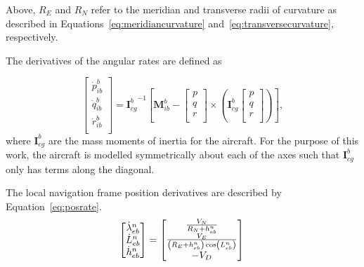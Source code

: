 Above, \(R_E\) and \(R_N\) refer to the meridian and transverse radii of curvature as described in Equations~\ref{eq:meridiancurvature} and~\ref{eq:transversecurvature}, respectively.

The derivatives of the angular rates are defined as

\begin{equation}\label{eq:angacc}
    \begin{bmatrix}
        \dot{p}_{ib}^b \\
        \dot{q}_{ib}^b \\
        \dot{r}_{ib}^b \\
    \end{bmatrix} =
    {\mathbf{I}_{cg}^b}^{-1}\left[\mathbf{M}_{ib}^b -
        \begin{bmatrix}
            p \\
            q \\
            r \\
        \end{bmatrix} \times
        \left(\mathbf{I}_{cg}^b
        \begin{bmatrix}
            p \\
            q \\
            r \\
        \end{bmatrix}
        \right)
        \right],
\end{equation}
where \(\mathbf{I}_{cg}^b\) are the mass moments of inertia for the aircraft. For the purpose of this work, the aircraft is modelled symmetrically about each of the axes such that \(\mathbf{I}_{cg}^b\) only has terms along the diagonal.

The local navigation frame position derivatives are described by Equation~\ref{eq:posrate}.
\begin{equation}\label{eq:posrate}
    \begin{bmatrix}
        \dot{\lambda}_{eb}^n \\
        \dot{L}_{eb}^n       \\
        \dot{h}_{eb}^n       \\
    \end{bmatrix} =
    \begin{bmatrix}
        \frac{V_N}{R_N + h_{eb}^n}                                       \\
        \frac{V_E}{\left(R_E + h_{eb}^n\right)\cos\left(L_{eb}^n\right)} \\
        -V_D                                                             \\
    \end{bmatrix}\\
\end{equation}

